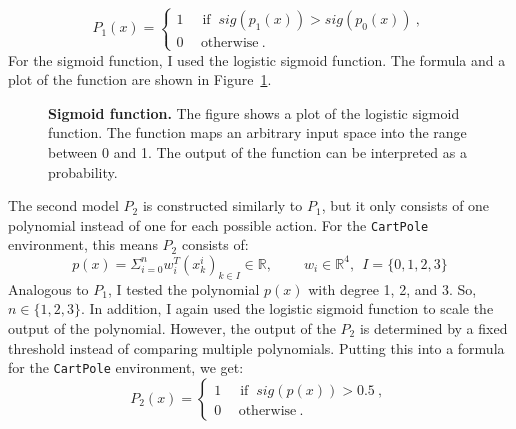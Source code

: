 \[
  P_1(x) =
  \begin{cases}1~&{\text{ if }}~sig(p_1(x)) > sig(p_0(x))~,\\0~&~\text{otherwise}~.\end{cases}
\]
For the sigmoid function, I used the logistic sigmoid function. The formula and a plot of the function are shown in Figure~\ref{fig:sigmoid}.

\begin{figure}[ht]
\centering
{}
\caption[Sigmoid function]{
  \textbf{Sigmoid function.}
  The figure shows a plot of the logistic sigmoid function. The function maps an arbitrary input space into the range between 0 and 1. The output of the function can be interpreted as a probability.
}
\label{fig:sigmoid}
\end{figure}


The second model $P_2$ is constructed similarly to $P_1$, but it only consists of one polynomial instead of one for each possible action. For the \verb|CartPole| environment, this means $P_2$ consists of:
\[
  p(x) = \Sigma_{i=0}^{n} w_i^T (x_k^i)_{k \in I} \in \mathbb{R}, \ \ \ \ \ \ \ \ \ \ w_i \in \mathbb{R}^4, \ \ I = \{0, 1, 2, 3\}
\]
Analogous to $P_1$, I tested the polynomial $p(x)$ with degree 1, 2, and 3. So, $n \in \{1, 2, 3\}$. In addition, I again used the logistic sigmoid function to scale the output of the polynomial. However, the output of the $P_2$ is determined by a fixed threshold instead of comparing multiple polynomials. Putting this into a formula for the \verb|CartPole| environment, we get:
\[
  P_2(x) =
  \begin{cases}1~&{\text{ if }}~sig(p(x))>0.5~,\\0~&~\text{otherwise}~.\end{cases}
\]




